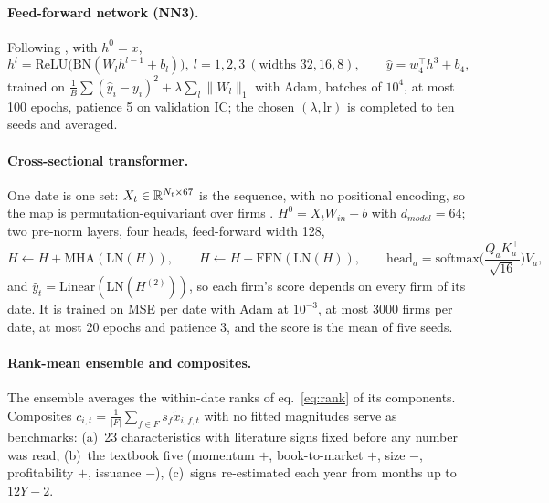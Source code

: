 \paragraph{Feed-forward network (NN3).}
Following \citet{gkx2020}, with $h^0=x$,
\begin{equation}\label{eq:nn3}
h^{l}=\mathrm{ReLU}\big(\mathrm{BN}(W_lh^{l-1}+b_l)\big),\ l=1,2,3\ (\text{widths }32,16,8),\qquad \hat y=w_4^\top h^3+b_4,
\end{equation}
trained on $\frac1B\sum(\hat y_i-y_i)^2+\lambda\sum_{l}\|W_l\|_1$ with Adam, batches of $10^4$, at most 100 epochs, patience 5 on validation IC; the chosen $(\lambda,\mathrm{lr})$ is completed to ten seeds and averaged.

\paragraph{Cross-sectional transformer.}
One date is one set: $X_t\in\mathbb{R}^{N_t\times67}$ is the sequence, with no positional encoding, so the map is permutation-equivariant over firms \citep{vaswani2017}. $H^0=X_tW_{in}+b$ with $d_{model}=64$; two pre-norm layers, four heads, feed-forward width 128,
\begin{equation}\label{eq:attn}
H\leftarrow H+\mathrm{MHA}(\mathrm{LN}(H)),\qquad H\leftarrow H+\mathrm{FFN}(\mathrm{LN}(H)),\qquad
\mathrm{head}_a=\mathrm{softmax}\Big(\frac{Q_aK_a^\top}{\sqrt{16}}\Big)V_a,
\end{equation}
and $\hat y_t=\mathrm{Linear}(\mathrm{LN}(H^{(2)}))$, so each firm's score depends on every firm of its date. It is trained on MSE per date with Adam at $10^{-3}$, at most 3000 firms per date, at most 20 epochs and patience 3, and the score is the mean of five seeds.

\paragraph{Rank-mean ensemble and composites.}
The ensemble averages the within-date ranks of eq.~\eqref{eq:rank} of its components. Composites $c_{i,t}=\frac1{|F|}\sum_{f\in F}s_f\tilde x_{i,f,t}$ with no fitted magnitudes serve as benchmarks: (a)~23 characteristics with literature signs fixed before any number was read, (b)~the textbook five (momentum $+$, book-to-market $+$, size $-$, profitability $+$, issuance $-$), (c)~signs re-estimated each year from months up to $12Y-2$.

